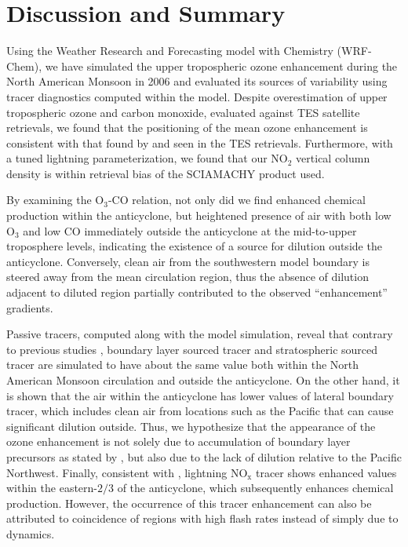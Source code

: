 \section{Discussion and Summary}\label{sect:summary}

Using the Weather Research and Forecasting model with Chemistry (WRF-Chem),
we have simulated the upper tropospheric ozone enhancement during the North
American Monsoon in 2006 and evaluated its sources of variability using tracer
diagnostics computed within the model. Despite overestimation of upper tropospheric
ozone and carbon monoxide, evaluated against TES satellite retrievals, we found that the positioning
of the mean ozone enhancement is consistent with that found by \citet{Cooper:2007cr} and seen in the TES retrievals.
Furthermore, with a tuned lightning parameterization, we found that our 
NO$_2$ vertical column density is within retrieval bias of the SCIAMACHY
product used.

By examining the O$_3$-CO relation, not only did we find enhanced chemical production
within the anticyclone, but heightened presence of air with both low O$_3$ and low CO
immediately outside the anticyclone at the mid-to-upper troposphere levels, indicating the existence of a
source for dilution outside the anticyclone. Conversely, clean air from the southwestern model
boundary is steered away from the mean circulation region, thus the absence of
dilution adjacent to diluted region partially contributed to the observed ``enhancement''
gradients.

Passive tracers, computed along with the model simulation, reveal that
contrary to previous studies \citep[e.g.][]{Li:2005ss,Cooper:2007cr,Barth:2012qf},
boundary layer sourced tracer and stratospheric sourced tracer are simulated
to have about the same value both within the North American Monsoon circulation and
outside the anticyclone. On the other
hand, it is shown that the air within the anticyclone has lower values of lateral boundary tracer,
which includes clean air from locations such as the Pacific that can cause significant
dilution outside. Thus, we hypothesize that the appearance of the ozone
enhancement is not solely due to accumulation of boundary layer precursors as
stated by \citet{Li:2005ss}, but also due to the lack of dilution relative to the Pacific Northwest. Finally,
consistent with \citet{Cooper:2007cr}, lightning NO$_{\mathrm{x}}$ tracer shows enhanced values
within the eastern-$2/3$ of the anticyclone, which subsequently enhances
chemical production. However, the occurrence of this tracer enhancement
can also be attributed to coincidence of regions with high flash rates instead
of simply due to dynamics.


